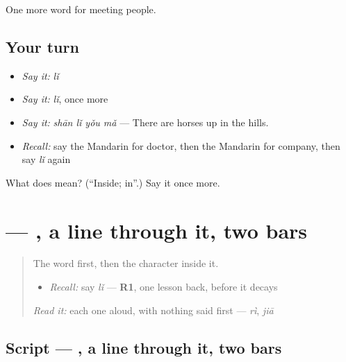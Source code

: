\begin{grammarlens}[title={What you've built}]
One more word for meeting people.
\end{grammarlens}

\subsection*{Your turn}
\begin{itemize}
\raggedright
  \item \emph{Say it:} \emph{lǐ}
  \item \emph{Say it:} \emph{lǐ}, once more
  \item \emph{Say it:} \emph{shān lǐ yǒu mǎ} — There are horses up in the hills.
  \item \emph{Recall:} say the Mandarin for doctor, then the Mandarin for company, then say \emph{lǐ} again
\end{itemize}

\begin{tcolorbox}[breakable,colback=teal!4,colframe=teal!35!black,title={Before you move on}]
What does  mean? (\textquotedblleft{}Inside; in\textquotedblright{}.) Say it once more.
\end{tcolorbox}
\section[\texorpdfstring{\zh{里} (lǐ)}{里 (lǐ)}]{ — , a line through it, two bars}

\label{lesson:ZH-W81-li-inside}



\begin{quote}
The word first, then the character inside it.

\begin{itemize}
\raggedright
  \item \emph{Recall:} say \emph{lǐ} — \textbf{R1}, one lesson back, before it decays
\end{itemize}

\begin{quote}
 
\end{quote}

\emph{Read it:} each one aloud, with nothing said first — \emph{rì}, \emph{jiā}
\end{quote}

\subsection*{Script — , a line through it, two bars}


